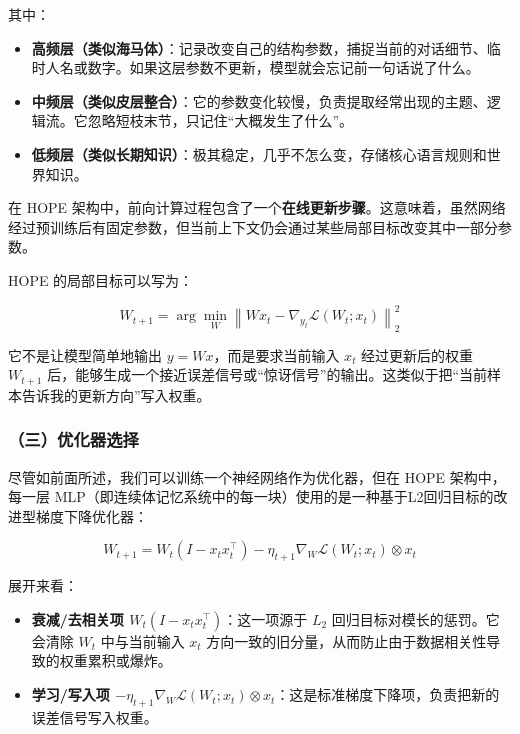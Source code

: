 其中：

\begin{itemize}
\tightlist
\item
  \textbf{高频层（类似海马体）}：记录改变自己的结构参数，捕捉当前的对话细节、临时人名或数字。如果这层参数不更新，模型就会忘记前一句话说了什么。
\item
  \textbf{中频层（类似皮层整合）}：它的参数变化较慢，负责提取经常出现的主题、逻辑流。它忽略短枝末节，只记住``大概发生了什么''。
\item
  \textbf{低频层（类似长期知识）}：极其稳定，几乎不怎么变，存储核心语言规则和世界知识。
\end{itemize}

在 HOPE 架构中，前向计算过程包含了一个\textbf{在线更新步骤}。这意味着，虽然网络经过预训练后有固定参数，但当前上下文仍会通过某些局部目标改变其中一部分参数。

HOPE 的局部目标可以写为：

\[
W_{t+1}
=
\arg\min_W
\left\|
W x_t - \nabla_{y_t}\mathcal{L}(W_t;x_t)
\right\|_2^2
\]

它不是让模型简单地输出 \(y=Wx\)，而是要求当前输入 \(x_t\) 经过更新后的权重 \(W_{t+1}\) 后，能够生成一个接近误差信号或``惊讶信号''的输出。这类似于把``当前样本告诉我的更新方向''写入权重。

\hypertarget{ux4e09ux4f18ux5316ux5668ux9009ux62e9}{%
\subsubsection{（三）优化器选择}\label{ux4e09ux4f18ux5316ux5668ux9009ux62e9}}

尽管如前面所述，我们可以训练一个神经网络作为优化器，但在 HOPE 架构中，每一层 MLP（即连续体记忆系统中的每一块）使用的是一种基于L2回归目标的改进型梯度下降优化器：

\[
W_{t+1}
=
W_t(I-x_tx_t^\top)
-
\eta_{t+1}\nabla_W\mathcal{L}(W_t;x_t)\otimes x_t
\]

展开来看：

\begin{itemize}
\tightlist
\item
  \textbf{衰减/去相关项 \(W_t(I-x_tx_t^\top)\)}：这一项源于 \(L_2\) 回归目标对模长的惩罚。它会清除 \(W_t\) 中与当前输入 \(x_t\) 方向一致的旧分量，从而防止由于数据相关性导致的权重累积或爆炸。
\item
  \textbf{学习/写入项 \(-\eta_{t+1}\nabla_W\mathcal{L}(W_t;x_t)\otimes x_t\)}：这是标准梯度下降项，负责把新的误差信号写入权重。
\end{itemize}

